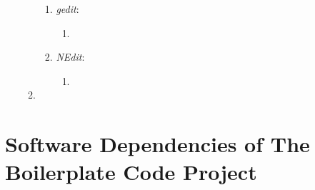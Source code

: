 \begin{enumerate}
\begin{enumerate}
		\begin{enumerate} \itemsep -2pt
		\item {\it gedit}: \vspace{-0.1cm}
			\begin{enumerate} \itemsep -1pt
			\item 
			\end{enumerate}
		\item {\it NEdit}: \vspace{-0.1cm}
			\begin{enumerate} \itemsep -1pt
			\item 
			\end{enumerate}
		\end{enumerate}
	\item 
	\end{enumerate}
\end{enumerate}








\section{Software Dependencies of The Boilerplate Code Project}
\label{sec:SoftwareDependenciesOfTheBoilerplateCodeProject}











